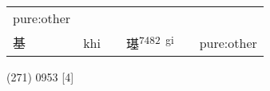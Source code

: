 \documentclass[14pt,a4paper]{scrartcl}
\begin{document}
\begin{longtable}[c]{@{}llllll@{}}
\begin{minipage}[t]{0.14\columnwidth}
pure:other
\strut\end{minipage}\tabularnewline
\begin{minipage}[t]{0.14\columnwidth}\raggedright\strut
基
\strut\end{minipage} &
\begin{minipage}[t]{0.14\columnwidth}\raggedright\strut
khi
\strut\end{minipage} &
\begin{minipage}[t]{0.14\columnwidth}\raggedright\strut
\strut\end{minipage} &
\begin{minipage}[t]{0.14\columnwidth}\raggedright\strut
璂\textsuperscript{7482~gi}
\strut\end{minipage} &
\begin{minipage}[t]{0.14\columnwidth}\raggedright\strut
\strut\end{minipage} &
\begin{minipage}[t]{0.14\columnwidth}\raggedright\strut
pure:other
\strut\end{minipage}\tabularnewline
\bottomrule
\end{longtable}

(271) 0953 {[}4{]}
\end{document}
